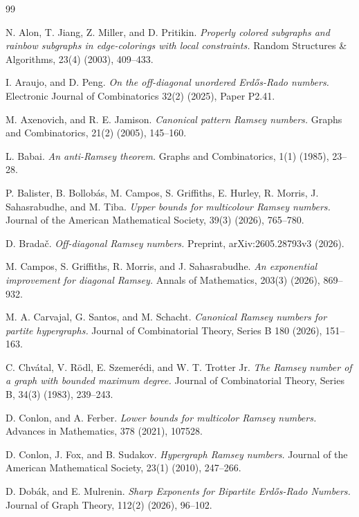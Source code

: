 \documentclass[10pt,a4paper]{article}
\theoremstyle{plain}
\theoremstyle{definition}
\begin{document}
\begin{thebibliography}{99}

N. Alon, T. Jiang, Z. Miller, and D. Pritikin.
\emph{Properly colored subgraphs and rainbow subgraphs in edge-colorings
with local constraints.}
Random Structures \& Algorithms, 23(4) (2003), 409--433.

I. Araujo, and D. Peng.
\emph{On the off-diagonal unordered Erd{\H{o}}s-Rado numbers.}
Electronic Journal of Combinatorics 32(2) (2025), Paper P2.41.

M. Axenovich, and R. E. Jamison.
\emph{Canonical pattern Ramsey numbers.}
Graphs and Combinatorics, 21(2) (2005), 145--160.

L. Babai.
\emph{An anti-Ramsey theorem.}
Graphs and Combinatorics, 1(1) (1985), 23--28.

P. Balister, B. Bollob{\'a}s, M. Campos, S. Griffiths, E. Hurley, R. Morris, J. Sahasrabudhe, and M. Tiba.
\emph{Upper bounds for multicolour Ramsey numbers.}
Journal of the American Mathematical Society, 39(3) (2026), 765--780.

D. Brada\v{c}.
\emph{Off-diagonal Ramsey numbers.}
Preprint, arXiv:2605.28793v3 (2026).

M. Campos, S. Griffiths, R. Morris, and J. Sahasrabudhe.
\emph{An exponential improvement for diagonal Ramsey.}
Annals of Mathematics, 203(3) (2026), 869--932.

M. A. Carvajal, G. Santos, and M. Schacht.
\emph{Canonical Ramsey numbers for partite hypergraphs.}
Journal of Combinatorial Theory, Series B 180 (2026), 151--163.

C. Chv{\'a}tal, V. R{\"o}dl, E. Szemer{\'e}di, and W. T. Trotter Jr.
\emph{The Ramsey number of a graph with bounded maximum degree.}
Journal of Combinatorial Theory, Series B, 34(3) (1983), 239--243.

D. Conlon, and A. Ferber.
\emph{Lower bounds for multicolor Ramsey numbers.}
Advances in Mathematics, 378 (2021), 107528.

D. Conlon, J. Fox, and B. Sudakov.
\emph{Hypergraph Ramsey numbers.}
Journal of the American Mathematical Society, 23(1) (2010), 247--266.

D. Dob{\'a}k, and E. Mulrenin.
\emph{Sharp Exponents for Bipartite Erd{\H{o}}s-Rado Numbers.}
Journal of Graph Theory, 112(2) (2026), 96--102.


\end{thebibliography}
\end{document}
